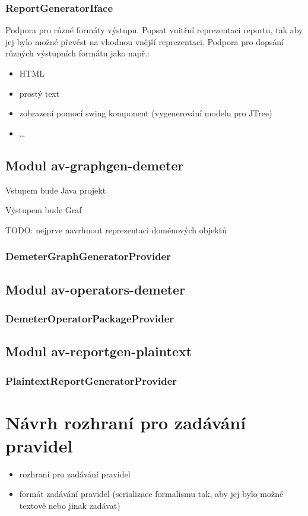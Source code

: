 \subsubsection{ReportGeneratorIface}
Podpora pro různé formáty výstupu. Popsat vnitřní reprezentaci reportu, tak aby jej bylo možné převést na vhodnou vnější reprezentaci. Podpora pro dopsání různých výstupních formátu jako např.:
\begin{itemize}
\item HTML
\item prostý text
\item zobrazení pomocí swing komponent (vygenerování modelu pro JTree)
\item \ldots
\end{itemize}


\subsection{Modul av-graphgen-demeter}

Vstupem bude Java projekt

Výstupem bude Graf

TODO: nejprve navrhnout reprezentaci doménových objektů

\subsubsection{DemeterGraphGeneratorProvider}

\subsection{Modul av-operators-demeter}
\subsubsection{DemeterOperatorPackageProvider}

\subsection{Modul av-reportgen-plaintext}
\subsubsection{PlaintextReportGeneratorProvider}



\section{Návrh rozhraní pro zadávání pravidel}
\begin{itemize}
\item rozhraní pro zadávání pravidel
\item formát zadávání pravidel (serializace formalismu tak, aby jej bylo možné textově nebo jinak zadávat)
\end{itemize}

